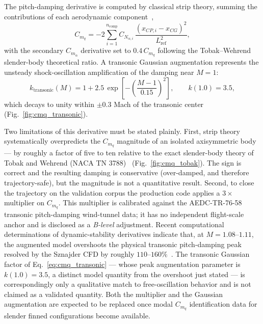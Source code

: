 The pitch-damping derivative is computed by classical strip theory,
summing the contributions of each aerodynamic component~\cite{tobak1956},
%
\begin{equation}
C_{m_q} = -2 \sum_{i=1}^{n_{\mathrm{comp}}}
  C_{N_{\alpha,i}}\,
  \frac{(x_{CP,i} - x_{CG})^2}{L_{\mathrm{ref}}^2},
\label{eq:cmq}
\end{equation}
%
with the secondary $C_{m_{\dot\alpha}}$ derivative set to
$0.4\,C_{m_q}$ following the Tobak--Wehrend slender-body theoretical
ratio. A transonic Gaussian augmentation represents the unsteady
shock-oscillation amplification of the damping near $M = 1$:
%
\begin{equation}
k_{\mathrm{transonic}}(M) = 1
  + 2.5\,\exp\!\left[-\left(\frac{M-1}{0.15}\right)^{2}\right],
  \qquad k(1.0) = 3.5,
\label{eq:cmq_transonic}
\end{equation}
%
which decays to unity within $\pm 0.3$ Mach of the transonic center
(Fig.~\ref{fig:cmq_transonic}).

Two limitations of this derivative must be stated plainly. First, strip
theory systematically overpredicts the $C_{m_q}$ magnitude of an
isolated axisymmetric body --- by roughly a factor of five to ten
relative to the exact slender-body theory of Tobak and Wehrend
(NACA TN 3788)~\cite{tobak1956} (Fig.~\ref{fig:cmq_tobak}). The sign is
correct and the resulting damping is conservative (over-damped, and
therefore trajectory-safe), but the magnitude is not a quantitative
result. Second, to close the trajectory on the validation corpus the
production code applies a $3\times$ multiplier on $C_{m_q}$. This
multiplier is calibrated against the AEDC-TR-76-58 transonic
pitch-damping wind-tunnel data; it has no independent flight-scale
anchor and is disclosed as a \emph{B-level} adjustment. Recent
computational determinations of dynamic-stability derivatives indicate
that, at $M = 1.08$--$1.11$, the augmented model overshoots the physical
transonic pitch-damping peak resolved by the Sznajder CFD by roughly
$110$--$160\%$~\cite{sznajder2025}. The transonic Gaussian factor of
Eq.~\eqref{eq:cmq_transonic} --- whose peak augmentation parameter is
$k(1.0) = 3.5$, a distinct model quantity from the overshoot just
stated --- is correspondingly only a qualitative match to
free-oscillation behavior and is not claimed as a validated quantity. Both the multiplier and the Gaussian augmentation
are expected to be replaced once modal $C_{m_q}$ identification data for
slender finned configurations become available.

